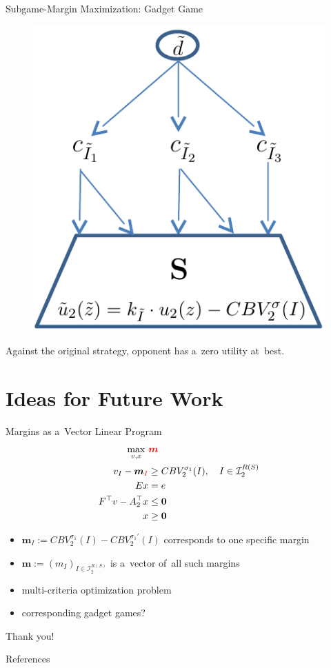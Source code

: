 \documentclass{beamer}
\newcommand{\vect}[1]{\boldsymbol{#1}}
\newcommand{\I}{\mathcal{I}}
\begin{document}
  \begin{frame}{Subgame-Margin Maximization: Gadget Game}
    \begin{figure}
      \centering
      \includegraphics[width=.5\textwidth]{../img/max-margin-gadget.png}
    \end{figure}
    \pause

    Against the original strategy, opponent has a~zero utility at~best.
  \end{frame}


  \section{Ideas for Future Work}

  \begin{frame}{Margins as a~Vector Linear Program}
    \begin{equation*}
      \label{vlp:max-margins}
      \begin{split}
        \max_{v, x}\ &\textcolor{red}{\vect{m}} \\
        v_I - \vect{m}_{\textcolor{red}{I}} &\ge CBV_2^{\sigma_1}(I), \quad I \in \I_2^{R(S)}\\ 
        Ex &= e \\
        F^\top v - A_2^\top x &\le \vect{0} \\
        x &\ge \vect{0}
      \end{split}
    \end{equation*}

    \pause
    \begin{itemize}[<+- | alert@+>]
      \item $\vect{m}_I := CBV_2^{\sigma_1} (I) - CBV_2^{\sigma_1'} (I)$ corresponds to one specific margin
      \item $\vect{m} := (m_I) _{I\in\I_2^{R(S)}}$ is a~vector of~all such margins
      \item multi-criteria optimization problem
      \item corresponding gadget games?
    \end{itemize}
  \end{frame}

  \begin{frame}[standout]
    \begin{center}
      Thank you!
    \end{center}
  \end{frame}

  \begin{frame}[allowframebreaks]{References}
    \tiny
    \printbibliography[heading=none]
  \end{frame}
\end{document}
